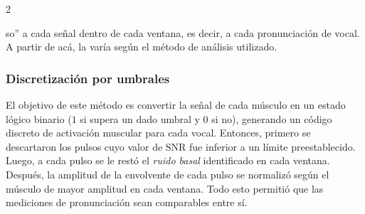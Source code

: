 \documentclass[11pt, letterpaper]{article}
\begin{document}
\begin{multicols*}{2}
    
\noindent so” a cada señal dentro de cada ventana, es decir, a cada pronunciación de vocal. A partir de acá, la  varía según el método de análisis utilizado.

\subsubsection*{Discretización por umbrales}

El objetivo de este método es convertir la señal de cada músculo en un estado lógico binario ($1$ si supera un dado umbral y $0$ si no), generando un código discreto de activación muscular para cada vocal. Entonces, primero se descartaron los pulsos cuyo valor de SNR fue inferior a un límite preestablecido. Luego, a cada pulso se le restó el \textit{ruido basal} identificado en cada ventana. Después, la amplitud de la envolvente de cada pulso se normalizó según el músculo de mayor amplitud en cada ventana. Todo esto permitió que las mediciones de pronunciación sean comparables entre sí. 


\end{multicols*}
\end{document}
